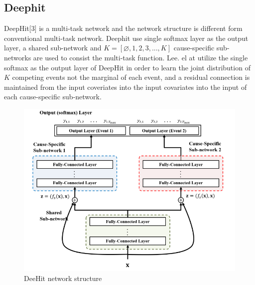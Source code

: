 \documentclass[conference]{IEEEconf}
\begin{document}
\subsection{Deephit}

DeepHit[3] is a multi-task network and the network structure is different form conventional multi-task network. Deephit use single softmax layer as the output layer, a shared sub-network and  $K=[\varnothing,1,2,3,...,K]$ cause-specific sub-networks are used to consist the multi-task function. Lee. el at utilize the single softmax as the output layer of DeepHit in order to learn the joint distribution of $K$ competing events not the marginal of each event, and a residual connection is maintained from the input coveriates into the input covariates into the input of each cause-specific sub-network.
\begin{figure}[htbp]
	\includegraphics[scale=0.5]{network.jpg}
	\caption{DeeHit network structure}
\end{figure}
\end{document}
